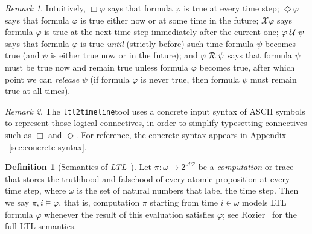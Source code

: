 \documentclass[conference]{IEEEtran}
\theoremstyle{definition}
\newtheorem{definition}{Definition}[section]
\theoremstyle{remark}
\newtheorem{remark}{Remark}[section]
\newcommand{\AP}{\mathcal{AP}}
\newcommand{\always}{\Box}
\newcommand{\eventually}{\Diamond}
\newcommand{\nextt}{\mathcal{X}}
\newcommand{\ltl}{\textit{LTL}}
\newcommand{\stronguntil}{\hspace{0.1cm} \mathcal{U}  \hspace{0.1cm}}
\newcommand{\weakrelease}{\hspace{0.1cm} \mathcal{R} \hspace{0.1cm}}
\newcommand{\tool}{\texttt{ltl2timeline}}
\renewcommand{\phi}{\varphi}
\begin{document}
\begin{remark}
    Intuitively, $\always \varphi$ says that formula $\varphi$ is true at every time step; $\eventually \varphi$ says that formula $\varphi$ is true either now or at some time in the future; $\nextt \varphi$ says formula $\varphi$ is true at the next time step immediately after the current one; $\varphi \stronguntil \psi$ says that formula $\varphi$ is true \textit{until} (strictly before) such time formula $\psi$ becomes true (and $\psi$ is either true now or in the future); and $\varphi \weakrelease \psi$ says that formula $\psi$ must be true now and remain true unless formula $\varphi$ becomes true, after which point we can \textit{release} $\psi$ (if formula $\phi$ is never true, then formula $\psi$ must remain true at all times).
\end{remark}

\begin{remark}
    The \tool tool uses a concrete input syntax of ASCII symbols to represent those logical connectives, in order to simplify typesetting connectives such as $\always$ and $\eventually$. For reference, the concrete syntax appears in Appendix ~\ref{sec:concrete-syntax}.
\end{remark}

\begin{definition}[Semantics of \ltl\ ]
    Let $\pi : \omega \rightarrow 2^{\AP}$ be a \emph{computation} or trace that stores the truthhood and falsehood of every atomic proposition at every time step, where $\omega$ is the set of natural numbers that label the time step.
    Then we say $\pi, i \models \varphi$, that is, computation $\pi$ starting from time $i \in \omega$ models LTL formula $\phi$ whenever the result of this evaluation satisfies $\phi$; see Rozier~\cite{Roz11} for the full LTL semantics. 
\end{definition}
\end{document}
